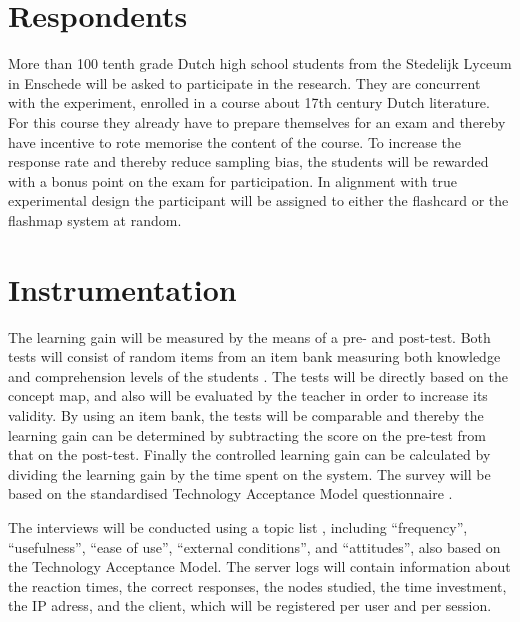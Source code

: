 \section{Respondents}



More than 100 tenth grade Dutch high school students from the Stedelijk Lyceum in Enschede will be asked to participate in the research. They are concurrent with the experiment, enrolled in a course about 17th century Dutch literature. For this course they already have to prepare themselves for an exam and thereby have incentive to rote memorise the content of the course. To increase the response rate and thereby reduce sampling bias, the students will be rewarded with a bonus point on the exam for participation. In alignment with true experimental design the participant will be assigned to either the flashcard or the flashmap system at random.

\section{Instrumentation}



The learning gain will be measured by the means of a pre- and post-test. Both tests will consist of random items from an item bank measuring both knowledge and comprehension levels of the students \cite{bloom}. The tests will be directly based on the concept map, and also will be evaluated by the teacher in order to increase its validity. By using an item bank, the tests will be comparable and thereby the learning gain can be determined by subtracting the score on the pre-test from that on the post-test. Finally the controlled learning gain can be calculated by dividing the learning gain by the time spent on the system. The survey will be based on the standardised Technology Acceptance Model questionnaire .

The interviews will be conducted using a topic list \cite{baarda}, including “frequency”, “usefulness”, “ease of use”, “external conditions”, and “attitudes”, also based on the Technology Acceptance Model. The server logs will contain information about the reaction times, the correct responses, the nodes studied, the time investment, the IP adress, and the client, which will be registered per user and per session.

